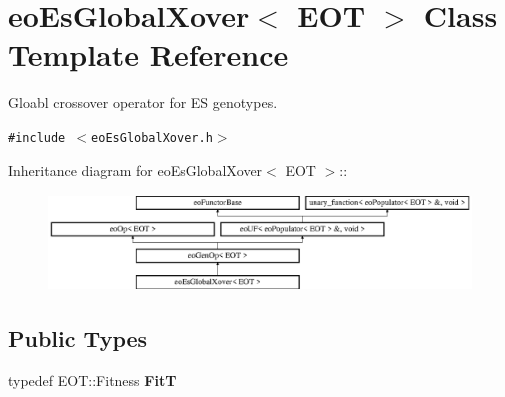 \section{eo\-Es\-Global\-Xover$<$ EOT $>$ Class Template Reference}
\label{classeo_es_global_xover}
Gloabl crossover operator for ES genotypes.  


{\tt \#include $<$eo\-Es\-Global\-Xover.h$>$}

Inheritance diagram for eo\-Es\-Global\-Xover$<$ EOT $>$::\begin{figure}[H]
\begin{center}
\leavevmode
\includegraphics[height=2.54835cm]{classeo_es_global_xover}
\end{center}
\end{figure}
\subsection*{Public Types}
\begin{CompactItemize}
\item 
typedef EOT::Fitness {\bf Fit\-T}\label{classeo_es_global_xover_w0}

\end{CompactItemize}
